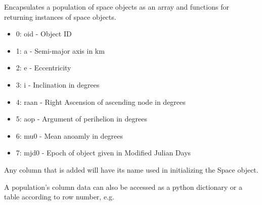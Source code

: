 \documentclass[letterpaper,10pt,english]{sphinxmanual}
\begin{document}
\begin{fulllineitems}
\label{\detokenize{modules/population:population.Population}}
Encapsulates a population of space objects as an array and functions for returning instances of space objects.

\begin{itemize}
\item {} 
0: oid - Object ID

\item {} 
1: a - Semi-major axis in km

\item {} 
2: e - Eccentricity

\item {} 
3: i - Inclination in degrees

\item {} 
4: raan - Right Ascension of ascending node in degrees

\item {} 
5: aop - Argument of perihelion in degrees

\item {} 
6: mu0 - Mean anoamly in degrees

\item {} 
7: mjd0 - Epoch of object given in Modified Julian Days

\end{itemize}

Any column that is added will have its name used in initializing the Space object.

A population’s column data can also be accessed as a python dictionary or a table according to row number, e.g.

%
\begin{sphinxVerbatim}[commandchars=\\\{\}]
  \PYG{p}{[}\PYG{p}{]}

  \PYG{p}{[}\PYG{p}{]}
\end{sphinxVerbatim}


\end{fulllineitems}
\end{document}
